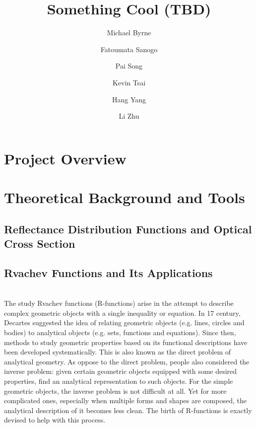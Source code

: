 \documentclass[12pt]{amsart}
\author{ Michael Byrne}
\author{Fatoumata Sanogo}
\author{Pai Song}
\author{Kevin Tsai}
\author{Hang Yang}
\author{Li Zhu}
\title{Something Cool (TBD)}
\begin{document}
\maketitle

\section{Project Overview}

\section{Theoretical Background and Tools}
\subsection{Reflectance Distribution Functions and Optical Cross Section}
\subsection{Rvachev Functions and Its Applications}~\\
The study Rvachev functions (R-functions) arise in the attempt to describe complex geometric objects with a single inequality or equation. In 17 century, Decartes suggested the idea of relating geometric objects (e.g. lines, circles and bodies) to analytical objects (e.g. sets, functions and equations). Since then, methods to study geometric properties based on its functional descriptions have been developed systematically. This is also known as the direct problem of analytical geometry. As oppose to the direct problem, people also considered the inverse problem: given certain geometric objects equipped with some desired properties, find an analytical representation to such objects. For the simple geometric objects, the inverse problem is not difficult at all. Yet for more complicated ones, especially when multiple forms and shapes are composed, the analytical description of it becomes less clean. The birth of R-functions is exactly devised to help with this process.    
\end{document}

